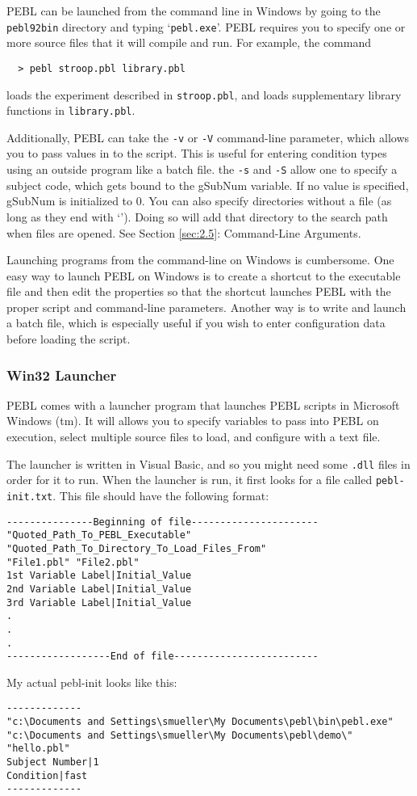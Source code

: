 PEBL can be launched from the command line in Windows by going to the
\texttt{pebl\char92bin} directory and typing `\texttt{pebl.exe}'.
PEBL requires you to specify one or more source files that it will
compile and run.  For example, the command
\begin{verbatim}
  > pebl stroop.pbl library.pbl
\end{verbatim}
loads the experiment described in \texttt{stroop.pbl}, and loads supplementary library functions in \texttt{library.pbl}.

Additionally, PEBL can take the \texttt{-v} or \texttt{-V}
command-line parameter, which allows you to pass values in to the
script.  This is useful for entering condition types using an outside
program like a batch file. the \texttt{-s} and \texttt{-S} allow one
to specify a subject code, which gets bound to the gSubNum variable.
If no value is specified, gSubNum is initialized to 0.  You can also
specify directories without a file (as long as they end with
`\texttt{}').  Doing so will add that directory to the search
path when files are opened. See Section \ref{sec:2.5}: Command-Line
Arguments.


Launching programs from the command-line on Windows is cumbersome.
One easy way to launch PEBL on Windows is to create a shortcut to the
executable file and then edit the properties so that the shortcut
launches PEBL with the proper script and command-line parameters.
Another way is to write and launch a batch file, which is especially
useful if you wish to enter configuration data before loading the
script.

\subsubsection{ Win32 Launcher}
PEBL comes with a launcher program that launches PEBL scripts in
Microsoft Windows (tm).  It will allows you to specify variables to
pass into PEBL on execution, select multiple source files to load, and
configure with a text file.

The launcher is written in Visual Basic, and so you might need some
\texttt{.dll} files in order for it to run.
\newpage
When the launcher is run, it first looks for a file called
\texttt{pebl-init.txt}. This file should have the following format:

\begin{verbatim}
---------------Beginning of file----------------------
"Quoted_Path_To_PEBL_Executable"
"Quoted_Path_To_Directory_To_Load_Files_From"
"File1.pbl" "File2.pbl"
1st Variable Label|Initial_Value
2nd Variable Label|Initial_Value
3rd Variable Label|Initial_Value
.
.
.
------------------End of file-------------------------
\end{verbatim}
My actual pebl-init looks like this:
\begin{verbatim}
-------------
"c:\Documents and Settings\smueller\My Documents\pebl\bin\pebl.exe"
"c:\Documents and Settings\smueller\My Documents\pebl\demo\"
"hello.pbl"
Subject Number|1
Condition|fast
-------------
\end{verbatim}


